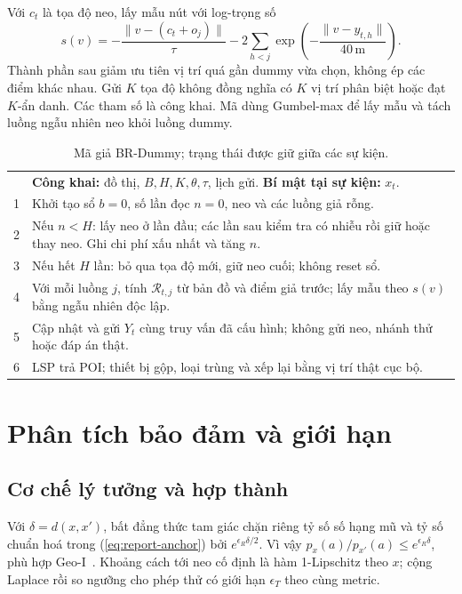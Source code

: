 Với $c_t$ là tọa độ neo, lấy mẫu nút với log-trọng số
\[
s(v)=-\frac{\|v-(c_t+o_j)\|}{\tau}
-2\sum_{h<j}\exp\!\left(-\frac{\|v-y_{t,h}\|}{40\,\mathrm{m}}\right).
\]
Thành phần sau giảm ưu tiên vị trí quá gần dummy vừa chọn, không ép các điểm khác nhau. Gửi $K$ tọa độ không đồng nghĩa có $K$ vị trí phân biệt hoặc đạt $K$-ẩn danh. Các tham số là công khai. Mã dùng Gumbel-max để lấy mẫu và tách luồng ngẫu nhiên neo khỏi luồng dummy.

\begin{table}[htbp]\centering\small
\caption{Mã giả BR-Dummy; trạng thái được giữ giữa các sự kiện.}
\begin{tabularx}{\textwidth}{P{0.6cm}Y}\toprule
& \textbf{Công khai:} đồ thị, $B,H,K,\theta,\tau$, lịch gửi. \textbf{Bí mật tại sự kiện:} $x_t$.\\
1 & Khởi tạo sổ $b=0$, số lần đọc $n=0$, neo và các luồng giả rỗng.\\
2 & Nếu $n<H$: lấy neo ở lần đầu; các lần sau kiểm tra có nhiễu rồi giữ hoặc thay neo. Ghi chi phí xấu nhất và tăng $n$.\\
3 & Nếu hết $H$ lần: bỏ qua tọa độ mới, giữ neo cuối; không reset sổ.\\
4 & Với mỗi luồng $j$, tính $\mathcal R_{t,j}$ từ bản đồ và điểm giả trước; lấy mẫu theo $s(v)$ bằng ngẫu nhiên độc lập.\\
5 & Cập nhật và gửi $Y_t$ cùng truy vấn đã cấu hình; không gửi neo, nhánh thử hoặc đáp án thật.\\
6 & LSP trả POI; thiết bị gộp, loại trùng và xếp lại bằng vị trí thật cục bộ.\\\bottomrule
\end{tabularx}\end{table}

\section{Phân tích bảo đảm và giới hạn}
\subsection{Cơ chế lý tưởng và hợp thành}

Với $\delta=d(x,x')$, bất đẳng thức tam giác chặn riêng tỷ số số hạng mũ và tỷ số chuẩn hoá trong (\ref{eq:report-anchor}) bởi $e^{\epsilon_R\delta/2}$. Vì vậy $p_x(a)/p_{x'}(a)\leq e^{\epsilon_R\delta}$, phù hợp Geo-I~\cite{andres2013geoi}. Khoảng cách tới neo cố định là hàm 1-Lipschitz theo $x$; cộng Laplace rồi so ngưỡng cho phép thử có giới hạn $\epsilon_T$ theo cùng metric.

